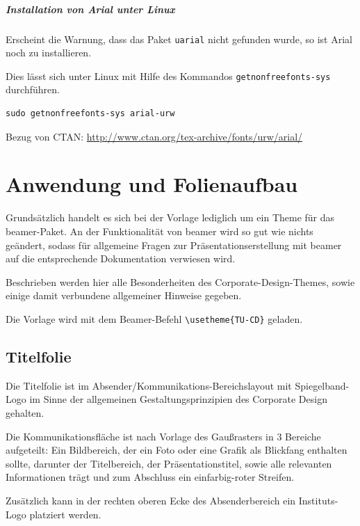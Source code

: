 \documentclass[cmyk,a4paper,colorscheme=green,TUBStitlepage=picture]{tubsreprt}
\begin{document}
\paragraph{Installation von Arial unter Linux}

Erscheint die Warnung, dass das Paket \lstinline{uarial} nicht gefunden wurde,
so ist Arial noch zu installieren.

Dies lässt sich unter Linux mit Hilfe des Kommandos
\lstinline{getnonfreefonts-sys} durchführen.

\begin{lstlisting}
sudo getnonfreefonts-sys arial-urw
\end{lstlisting}

Bezug von CTAN: \url{http://www.ctan.org/tex-archive/fonts/urw/arial/}


\chapter{Anwendung und Folienaufbau}

Grundsätzlich handelt es sich bei der Vorlage lediglich um ein Theme für
das beamer-Paket. An der Funktionalität von beamer wird so gut wie nichts
geändert, sodass für allgemeine Fragen zur Präsentationserstellung mit beamer
auf die entsprechende Dokumentation verwiesen wird. %

Beschrieben werden hier alle Besonderheiten des Corporate-Design-Themes, sowie
einige damit verbundene allgemeiner Hinweise gegeben.

Die Vorlage wird mit dem Beamer-Befehl \lstinline!\usetheme{TU-CD}! geladen.

\section{Titelfolie}

Die Titelfolie ist im Absender/Kommunikations-Bereichslayout mit
Spiegelband-Logo im Sinne der allgemeinen Gestaltungsprinzipien des
Corporate Design gehalten.

Die Kommunikationsfläche ist nach Vorlage des Gaußrasters %
in 3 Bereiche aufgeteilt:
Ein Bildbereich, der ein Foto oder eine Grafik als Blickfang enthalten
sollte,
darunter der Titelbereich, der Präsentationstitel, sowie alle relevanten
Informationen trägt
und zum Abschluss ein einfarbig-roter Streifen.

Zusätzlich kann in der rechten oberen Ecke des Absenderbereich ein
Instituts-Logo platziert werden.
\end{document}
